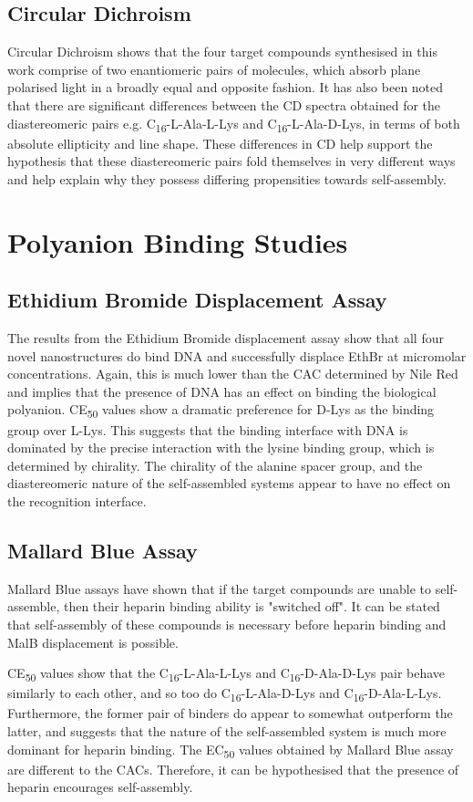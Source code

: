 \subsection{Circular Dichroism}
Circular Dichroism shows that the four target compounds synthesised in this work comprise of two enantiomeric pairs of molecules, which absorb plane polarised light in a broadly equal and opposite fashion. 
\newline
It has also been noted that there are significant differences between the CD spectra obtained for the diastereomeric pairs e.g. C\textsubscript{16}-L-Ala-L-Lys and C\textsubscript{16}-L-Ala-D-Lys, in terms of both absolute ellipticity and line shape. These differences in CD help support the hypothesis that these diastereomeric pairs fold themselves in very different ways and help explain why they possess differing propensities towards self-assembly. 
\section{Polyanion Binding Studies}
\subsection{Ethidium Bromide Displacement Assay}
The results from the Ethidium Bromide displacement assay show that all four novel nanostructures do bind DNA and successfully displace EthBr at micromolar concentrations. Again, this is much lower than the CAC determined by Nile Red and implies that the presence of DNA has an effect on binding the biological polyanion. CE\textsubscript{50} values show a dramatic preference for D-Lys as the binding group over L-Lys. This suggests that the binding interface with DNA is dominated by the precise interaction with the lysine binding group, which is determined by chirality. The chirality of the alanine spacer group, and the diastereomeric nature of the self-assembled systems appear to have no effect on the recognition interface. 

\subsection{Mallard Blue Assay}
Mallard Blue assays have shown that if the target compounds are unable to self-assemble, then their heparin binding ability is "switched off".  It can be stated that self-assembly  of these compounds is necessary before heparin binding and MalB displacement is possible. 

CE\textsubscript{50} values show that the C\textsubscript{16}-L-Ala-L-Lys and C\textsubscript{16}-D-Ala-D-Lys pair behave similarly to each other, and so too do C\textsubscript{16}-L-Ala-D-Lys and C\textsubscript{16}-D-Ala-L-Lys. Furthermore, the former pair of binders do appear to somewhat outperform the latter, and suggests that the nature of the self-assembled system is much more dominant for heparin binding. The EC\textsubscript{50} values obtained by Mallard Blue assay are different to the CACs. Therefore, it can be hypothesised that the presence of heparin encourages self-assembly. 

